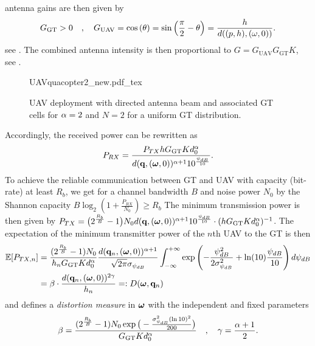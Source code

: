 \documentclass[smallabstract,smallcaptions]{dccpaper}
\newcommand{\Rb}{\ensuremath{R_b}}         %
\newcommand{\GGT}{\ensuremath{G_{\text{GT}}}}         %
\newcommand{\GUAV}{\ensuremath{G_{\text{UAV}}}}         %
\newcommand{\Dis}{\ensuremath{D}}                    %
\begin{document}
antenna gains are then given by 
%
\begin{equation}
\GGT >0\quad,\quad
  \GUAV = \cos\left(\theta\right)=\sin\left(\frac{\pi}{2}-\theta\right)=\frac{h}{d((p,h),(\ome,0))}.
\label{eq:Gdirected}
\end{equation}
%
see \cite[pp.52]{Bal05}. The combined antenna intensity is then proportional to
%
$G=\GUAV \GGT K$, see .
%
\begin{figure}
  \centering
  \def\svgwidth{.9\textwidth} \scriptsize{
    {UAVquacopter2_new.pdf_tex}}
    \caption{UAV deployment with directed antenna beam and associated GT cells for $\alpha=2$ and $N=2$ for a uniform GT distribution.}
    \label{fig:uavdirected}
\end{figure}
%
Accordingly, the received power can be rewritten as
%
\begin{equation}
  P_{RX}=\frac{P_{TX}h \GGT K d^{\alpha}_0}{d(\vq,(\vome,0))^{\alpha+1}10^{\frac{\psi_{dB}}{10}}}.
\end{equation}
%
To achieve the reliable communication between GT and UAV with capacity (bit-rate) at least $\Rb$, we get for a
channel bandwidth $B$  and noise power $N_0$ by the Shannon capacity 
$B\log_2\left(1+\frac{P_{RX}}{N_0}\right)\ge\Rb$
The minimum transmission power is then given by
$P_{TX}=\big(2^{\frac{\Rb}{B}}-1\big)N_0d(\vq,(\vome,0))^{\alpha+1}10^{\frac{\psi_{dB}}{10}} \cdot  (h \GGT
Kd^{\alpha}_0)^{-1}$.
%
%
The expectation of the minimum transmitter power of the $n$th UAV to the GT is then 
%
\begin{align}
  \Expect{P_{TX,n}}& =
  \frac{(2^{\frac{\Rb}{B}}-1)N_0 }{ h_n \GGT Kd^{\alpha}_0}
   \frac{d(\vq_n,(\vome,0))^{\alpha+1}}{\sqrt{2\pi}\sigma_{\psi_{dB}}} \int_{-\infty}^{+\infty}
     \exp\left(-\frac{\psi^2_{dB}}{2\sigma^2_{\psi_{dB}}}+ \ln(10) \frac{\psi_{dB}}{10}\right)d\psi_{dB}\notag\\
  &=\bet \cdot  \frac{d( \vq_n,(\vome,0))^{2\gam}}{h_n}=:\Dis(\vome,\vq_n) \label{eq:Eptx}
\end{align}
%
and defines a \emph{distortion measure} in $\boldsymbol{ \omega}$ with the independent and fixed parameters
%
\begin{align}
  \bet=\frac{(2^{\frac{\Rb}{B}}-1) N_0 \exp\big(-\frac{\sig_{\psi_{dB}}^2 (\ln 10)^2}{200}\big)}{\GGT K d_0^{\alp}}\quad,\quad
  \gam=\frac{\alp+1}{2}.
\end{align}
%
\end{document}
